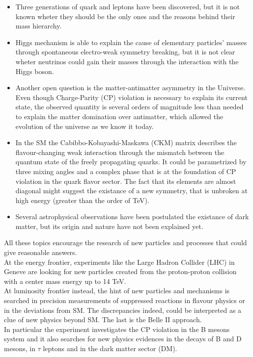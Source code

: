 \begin{itemize}
\item Three generations of quark and leptons have been discovered, but it is not known wheter they should be the only ones and the reasons behind their mass hierarchy.
\item Higgs mechanism is able to explain the cause of elementary particles' masses through spontaneous electro-weak symmetry breaking, but it is not clear wheter neutrinos could gain their masses through the interaction with the Higgs boson.
\item Another open question is the matter-antimatter asymmetry in the Universe. Even though Charge-Parity (CP) violation is necessary to explain its current state, the observed quantity is several orders of magnitude less than needed to explain the matter domination over antimatter, which allowed the evolution of the universe as we know it today.
\item In the SM the Cabibbo-Kobayashi-Maskawa (CKM) matrix describes the flavour-changing weak interaction through the mismatch between the quantum state of the freely propagating quarks. It could be parametrized by three mixing angles and a complex phase that is at the foundation of CP violation in the quark flavor sector. The fact that its elements are almost diagonal might suggest the existance of a new symmetry, that is unbroken at high energy (greater than the order of TeV).
\item Several astrophysical observations have been postulated the existance of dark matter, but its origin and nature have not been explained yet.
\end{itemize}

All these topics encourage the research of new particles and processes that could give reasonable answers.\\
At the energy frontier, experiments like the Large Hadron Collider (LHC) in Geneve are looking for new particles created from the proton-proton collision with a center mass energy up to 14 TeV.\\
At luminosity frontier instead, the hint of new particles and mechanisms is searched in precision measurements of suppressed reactions in flavour physics or in the deviations from SM. The discrepancies indeed, could be interpreted as a clue of new physics beyond SM. The last is the Belle II approach.\\


In particular the experiment investigates the CP violation in the B mesons system and it also searches for new physics evidences in the decays of B and D mesons, in $\tau$ leptons and in the dark matter sector (DM).

